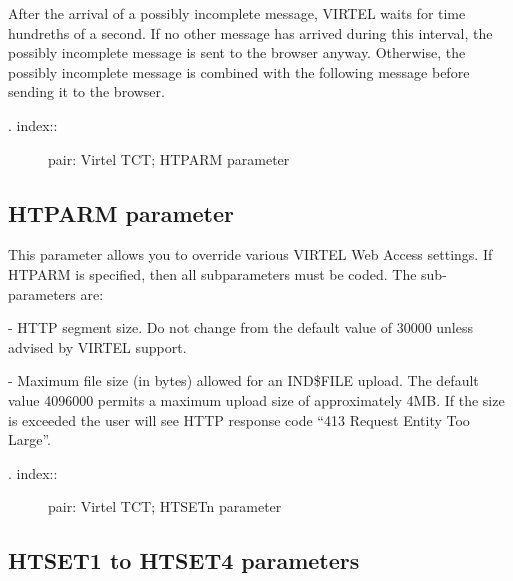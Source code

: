 \documentclass[letterpaper,10pt,english]{sphinxmanual}
\begin{document}
After the arrival of a possibly incomplete message, VIRTEL waits for time hundreths of a second. If no other message has arrived during this interval, the possibly incomplete message is sent to the browser anyway. Otherwise, the possibly incomplete message is combined with the following message before sending it to the browser.
\begin{description}
\item[{. index::}] \leavevmode
pair: Virtel TCT; HTPARM parameter

\end{description}


\subsection{HTPARM parameter}
\label{\detokenize{Installation_Guide:htparm-parameter}}
\begin{sphinxVerbatim}[commandchars=\\\{\}]
                 
\end{sphinxVerbatim}

This parameter allows you to override various VIRTEL Web Access settings. If HTPARM is specified, then all subparameters must be coded. The sub-parameters are:

 - HTTP segment size. Do not change from the default value of 30000 unless advised by VIRTEL support.

 - Maximum file size (in bytes) allowed for an IND\$FILE upload. The default value 4096000 permits a maximum upload size of approximately 4MB. If the size is exceeded the user will see HTTP response code “413 Request Entity Too Large”.
\begin{description}
\item[{. index::}] \leavevmode
pair: Virtel TCT; HTSETn parameter

\end{description}


\subsection{HTSET1 to HTSET4 parameters}
\label{\detokenize{Installation_Guide:htset1-to-htset4-parameters}}
\begin{sphinxVerbatim}[commandchars=\\\{\}]
          
\end{sphinxVerbatim}
\end{document}
